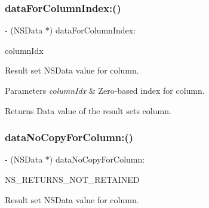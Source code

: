 \subsubsection{\texorpdfstring{data\+For\+Column\+Index\+:()}{dataForColumnIndex:()}}
{\footnotesize\ttfamily -\/ (N\+S\+Data $\ast$) data\+For\+Column\+Index\+: \begin{DoxyParamCaption}\item[{(int)}]{column\+Idx }\end{DoxyParamCaption}}

Result set {\ttfamily N\+S\+Data} value for column.


\begin{DoxyParams}{Parameters}
{\em column\+Idx} & Zero-\/based index for column.\\
\hline
\end{DoxyParams}
\begin{DoxyReturn}{Returns}
Data value of the result set\textquotesingle{}s column. 
\end{DoxyReturn}
\mbox{\label{interface_o_p_t_l_y_f_m_d_b_result_set_a4408546aea90f5eaf2044315b286edc6}} 
\subsubsection{\texorpdfstring{data\+No\+Copy\+For\+Column\+:()}{dataNoCopyForColumn:()}}
{\footnotesize\ttfamily -\/ (N\+S\+Data $\ast$) data\+No\+Copy\+For\+Column\+: \begin{DoxyParamCaption}\item[{(N\+S\+String $\ast$)}]{N\+S\+\_\+\+R\+E\+T\+U\+R\+N\+S\+\_\+\+N\+O\+T\+\_\+\+R\+E\+T\+A\+I\+N\+ED }\end{DoxyParamCaption}}

Result set {\ttfamily N\+S\+Data} value for column.



